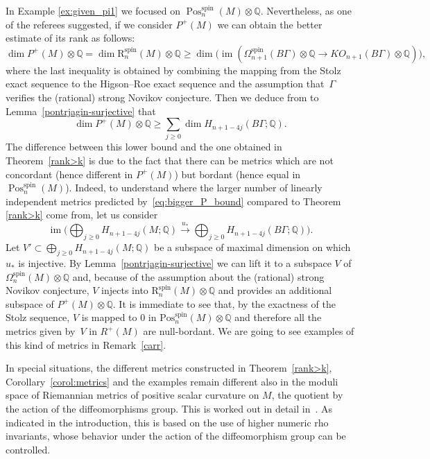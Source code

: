 \documentclass[10pt,a4paper]{amsart}
\numberwithin{equation}{section}
\def\QQ{\ensuremath{\mathbb{Q}}}
\newcommand{\rationals}{\mathbb{Q}}
\newcommand{\tensor}{\otimes}
\DeclareMathOperator{\Pos}{Pos}
\DeclareMathOperator{\im}{im}
\DeclareMathOperator{\spin}{spin}
\begin{document}
\begin{Remark}In Example \ref{ex:given_pi1} we focused on $\Pos^{\spin}_n(M)\tensor\rationals$. Nevertheless, as one of the referees suggested, if we consider $P^+(M)$ we can obtain the better estimate of its rank as follows:
 \begin{equation*}
 \dim P^+(M)\otimes\QQ= \dim \mathrm{R}^{\spin}_n(M)\tensor\rationals\geq
 \dim \big(\im(\Omega^{\spin}_{n+1}(B\Gamma)\otimes\QQ\to KO_{n+1}(B\Gamma)\otimes\QQ)\big),
 \end{equation*}
 where the last inequality is obtained by combining the mapping
 from the Stolz exact sequence to the Higson--Roe exact
 sequence and the assumption that~$\Gamma$ verifies the
 (rational) strong Novikov conjecture. Then we deduce from to Lemma~\ref{pontrjagin-surjective} that
 \begin{equation}\label{eq:bigger_P_bound}
 \dim P^+(M)\otimes\QQ\geq \sum_{j\geq0}\dim H_{n+1-4j}(B\Gamma;\QQ).\end{equation}
 The difference between this lower bound and the one obtained
 in Theorem~\ref{rank>k} is due to the fact that there
 can be metrics which are not concordant (hence different in
 $P^+(M)$) but bordant (hence equal in $\Pos^{\spin}_n(M)$).
 Indeed, to understand where the larger number of linearly
 independent metrics predicted by~\eqref{eq:bigger_P_bound}
 compared to Theorem \ref{rank>k} come from, let us
 consider \[\im\bigg(\bigoplus_{j\geq0}H_{n+1-4j}(M;\QQ)\xrightarrow{u_*}
 \bigoplus_{j\geq0}H_{n+1-4j}(B\Gamma;\QQ)\bigg).\] Let $V'\subset
 \bigoplus_{j\geq0}H_{n+1-4j}(M;\QQ)$ be a subspace of maximal
 dimension on which $u_*$ is injective. By Lemma~\ref{pontrjagin-surjective} we can lift it to a subspace $V$ of
 $\Omega_n^{\spin}(M)\tensor\rationals$ and, because of the
 assumption about the (rational)
strong Novikov conjecture, $V$ injects into
 $\mathrm{R}^{\spin}_n(M)\otimes\QQ$ and provides an additional
 subspace of $P^+(M)\otimes\QQ$. It is immediate to see that, by
 the exactness of the Stolz sequence, $V$ is mapped to $0$ in $\mathrm{Pos}^{\spin}_n(M)\otimes\QQ$
 and therefore all the metrics given by~$V$ in $R^+(M)$ are
 null-bordant.
 We are going to see examples of this kind of metrics in Remark~\ref{carr}.
\end{Remark}

\begin{Remark}
 In special situations, the different metrics constructed in Theorem~\ref{rank>k}, Corollary~\ref{corol:metrics} and the examples remain
 different also in the moduli space of Riemannian metrics of positive scalar
 curvature on $M$, the quotient by the action of the diffeomorphisms
 group. This is worked out in detail in~\cite{PiazzaSchickZenobi_pairing}. As indicated in the introduction, this is based
 on the use of higher numeric rho invariants, whose behavior under the action
 of the diffeomorphism group can be controlled.
\end{Remark}
\end{document}
